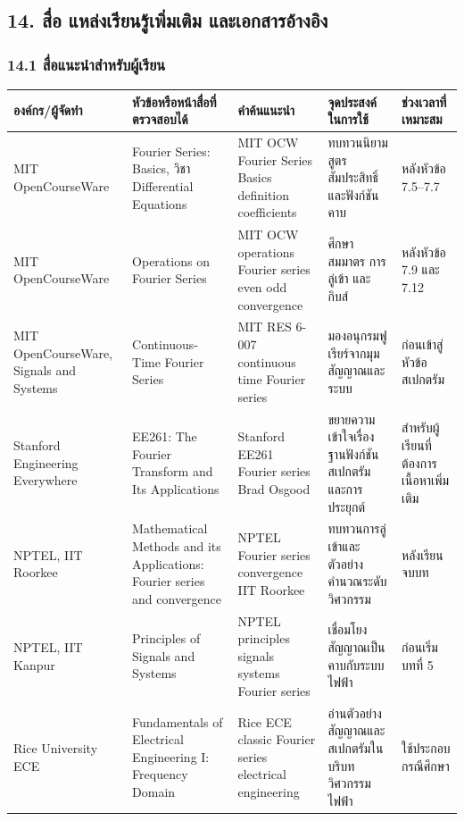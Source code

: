 \subsection{14. สื่อ แหล่งเรียนรู้เพิ่มเติม และเอกสารอ้างอิง}

\subsubsection{14.1 สื่อแนะนำสำหรับผู้เรียน}

\begin{table}[htbp]
    \centering
    \footnotesize
    \begin{tabularx}{\textwidth}{L{0.15\textwidth} Y Y Y L{0.15\textwidth}}
        \hline
        \textbf{องค์กร/ผู้จัดทำ} & \textbf{หัวข้อหรือหน้าสื่อที่ตรวจสอบได้} & \textbf{คำค้นแนะนำ} & \textbf{จุดประสงค์ในการใช้} & \textbf{ช่วงเวลาที่เหมาะสม} \\
        \hline
        MIT OpenCourseWare & Fourier Series: Basics, วิชา Differential Equations & MIT OCW Fourier Series Basics definition coefficients & ทบทวนนิยาม สูตรสัมประสิทธิ์ และฟังก์ชันคาบ & หลังหัวข้อ 7.5--7.7 \\
        MIT OpenCourseWare & Operations on Fourier Series & MIT OCW operations Fourier series even odd convergence & ศึกษาสมมาตร การลู่เข้า และกิบส์ & หลังหัวข้อ 7.9 และ 7.12 \\
        MIT OpenCourseWare, Signals and Systems & Continuous-Time Fourier Series & MIT RES 6-007 continuous time Fourier series & มองอนุกรมฟูเรียร์จากมุมสัญญาณและระบบ & ก่อนเข้าสู่หัวข้อสเปกตรัม \\
        Stanford Engineering Everywhere & EE261: The Fourier Transform and Its Applications & Stanford EE261 Fourier series Brad Osgood & ขยายความเข้าใจเรื่องฐานฟังก์ชัน สเปกตรัม และการประยุกต์ & สำหรับผู้เรียนที่ต้องการเนื้อหาเพิ่มเติม \\
        NPTEL, IIT Roorkee & Mathematical Methods and its Applications: Fourier series and convergence & NPTEL Fourier series convergence IIT Roorkee & ทบทวนการลู่เข้าและตัวอย่างคำนวณระดับวิศวกรรม & หลังเรียนจบบท \\
        NPTEL, IIT Kanpur & Principles of Signals and Systems & NPTEL principles signals systems Fourier series & เชื่อมโยงสัญญาณเป็นคาบกับระบบไฟฟ้า & ก่อนเริ่มบทที่ 5 \\
        Rice University ECE & Fundamentals of Electrical Engineering I: Frequency Domain & Rice ECE classic Fourier series electrical engineering & อ่านตัวอย่างสัญญาณและสเปกตรัมในบริบทวิศวกรรมไฟฟ้า & ใช้ประกอบกรณีศึกษา \\
        \hline
    \end{tabularx}
\end{table}

